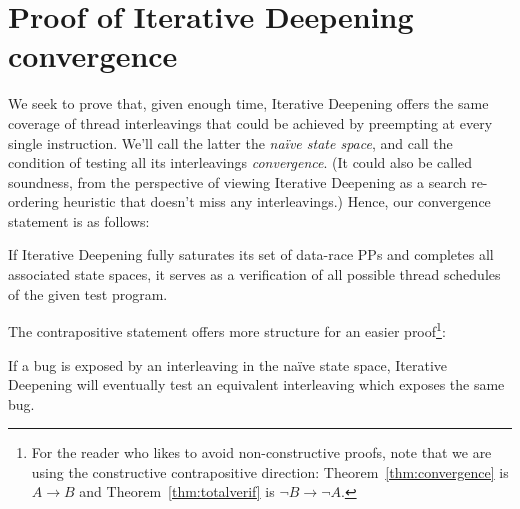 \section{Proof of Iterative Deepening convergence}

We seek to prove that, given enough time, Iterative Deepening offers the same coverage of thread interleavings that could be achieved by preempting at every single instruction.
We'll call the latter the {\em na\"{i}ve state space}, and call the condition of testing all its interleavings {\em convergence}.
(It could also be called soundness, from the perspective of viewing Iterative Deepening as a search re-ordering heuristic that doesn't miss any interleavings.)
Hence, our convergence statement is as follows:

\begin{theorem}
	If Iterative Deepening fully saturates its set of data-race PPs and completes all associated state spaces,
	it serves as a verification of all possible thread schedules of the given test program.
	\label{thm:totalverif}
\end{theorem}

The contrapositive statement offers more structure for an easier proof\footnote{
For the reader who likes to avoid non-constructive proofs, %
note that we are using the constructive contrapositive direction:
Theorem~\ref{thm:convergence} is $A \rightarrow B$ and Theorem~\ref{thm:totalverif} is $\neg B \rightarrow \neg A$.}:

\begin{theorem}
	If a bug is exposed by an interleaving in the na\"{i}ve state space, Iterative Deepening will eventually test an equivalent interleaving which exposes the same bug.
	\label{thm:convergence}
\end{theorem}

